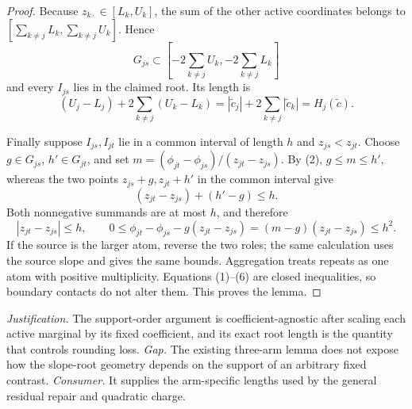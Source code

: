 \documentclass{article}
\begin{document}
\begin{proof}
Because \(z_{k\cdot}\in[L_k,U_k]\), the sum of the other active coordinates belongs to \([\sum_{k\ne j}L_k,\sum_{k\ne j}U_k]\).  Hence
\[
 G_{js}\subset\left[-2\sum_{k\ne j}U_k,-2\sum_{k\ne j}L_k\right]
\]
and every \(I_{js}\) lies in the claimed root.  Its length is
\[
 (U_j-L_j)+2\sum_{k\ne j}(U_k-L_k)
 =|\widetilde c_j|+2\sum_{k\ne j}|\widetilde c_k|
 =H_j(\widetilde c). \tag{4}
\]

Finally suppose \(I_{js},I_{jt}\) lie in a common interval of length \(h\) and \(z_{js}<z_{jt}\).  Choose \(g\in G_{js}\), \(h'\in G_{jt}\), and set \(m=(\phi_{jt}-\phi_{js})/(z_{jt}-z_{js})\).  By (2), \(g\le m\le h'\), whereas the two points \(z_{js}+g,z_{jt}+h'\) in the common interval give
\[
 (z_{jt}-z_{js})+(h'-g)\le h. \tag{5}
\]
Both nonnegative summands are at most \(h\), and therefore
\[
 |z_{jt}-z_{js}|\le h,\qquad
 0\le\phi_{jt}-\phi_{js}-g(z_{jt}-z_{js})
 =(m-g)(z_{jt}-z_{js})\le h^2. \tag{6}
\]
If the source is the larger atom, reverse the two roles; the same calculation uses the source slope and gives the same bounds.  Aggregation treats repeats as one atom with positive multiplicity.  Equations (1)--(6) are closed inequalities, so boundary contacts do not alter them.  This proves the lemma.
\end{proof}
\par\smallskip\noindent \textit{Justification.} The support-order argument is coefficient-agnostic after scaling each active marginal by its fixed coefficient, and its exact root length is the quantity that controls rounding loss. \textit{Gap.} The existing three-arm lemma does not expose how the slope-root geometry depends on the support of an arbitrary fixed contrast. \textit{Consumer.} It supplies the arm-specific lengths used by the general residual repair and quadratic charge.
\end{document}
